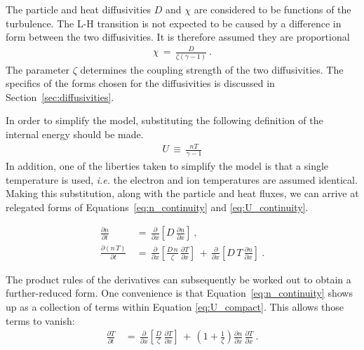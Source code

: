 The particle and heat diffusivities $D$ and $\chi$ are considered to be functions of the turbulence.
The L-H transition is not expected to be caused by a difference in form between the two diffusivities.
It is therefore assumed they are proportional
\begin{align} %
	\chi \,=\, \frac{D}{\zeta (\gamma - 1)} \label{eq:heat_particle_diff_relation}~.
\end{align}
The parameter $\zeta$ determines the coupling strength of the two diffusivities. The specifics of the forms chosen for the diffusivities is discussed in Section~\ref{sec:diffusivities}.

In order to simplify the model, substituting the following definition of the internal energy should be made.
\begin{align} %
	U \,\equiv\, \frac{n T}{\gamma - 1} \label{eq:U_definition}
\end{align}
In addition, one of the liberties taken to simplify the model is that a single temperature is used, \emph{i.e.} the electron and ion temperatures are assumed identical.
Making this substitution, along with the particle and heat fluxes, we can arrive at relegated forms of Equations~\ref{eq:n_continuity} and \ref{eq:U_continuity}.

\begin{align} %
	\frac{\partial n}{\partial t} \,&=\, \frac{\partial}{\partial x} \left[D \,
		\frac{\partial n}{\partial x}\right]~,\label{eq:n_compact} \\
	\frac{\partial(n\,T)}{\partial t} \,&=\, \frac{\partial}{\partial x}
		\left[\frac{D\,n}{\zeta} \, \frac{\partial T}{\partial x}\right]
		\,+\, \frac{\partial}{\partial x}
		\left[D\,T \, \frac{\partial n}{\partial x}\right]~. \label{eq:U_compact}
\end{align}

The product rules of the derivatives can subsequently be worked out to obtain a further-reduced form.
One convenience is that Equation~\ref{eq:n_continuity} shows up as a collection of terms within Equation \ref{eq:U_compact}.
This allows those terms to vanish:
\begin{align} %
	\frac{\partial T}{\partial t} \,&=\, \frac{\partial}{\partial x} \left[\frac{D}{\zeta} 
		\, \frac{\partial T}{\partial x}\right] \,+\,
		\left(1 + \frac{1}{\zeta}\right) \frac{\partial n}{\partial x} \,
		\frac{\partial T}{\partial x}~. \label{eq:T_compact}
\end{align}

